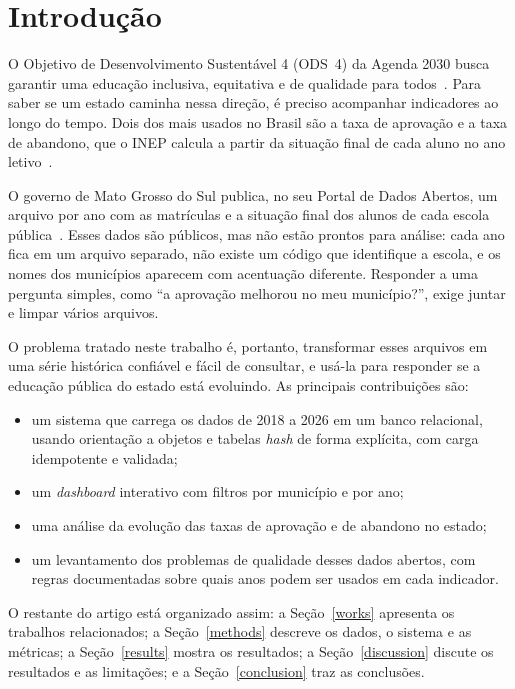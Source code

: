 \documentclass[preprint,10pt,5p]{elsarticle}
\begin{document}

\section{Introdução}
\label{intro}

O Objetivo de Desenvolvimento Sustentável 4 (ODS~4) da Agenda 2030 busca garantir uma educação inclusiva, equitativa e de qualidade para todos~\citep{onu2015ods4}. Para saber se um estado caminha nessa direção, é preciso acompanhar indicadores ao longo do tempo. Dois dos mais usados no Brasil são a taxa de aprovação e a taxa de abandono, que o INEP calcula a partir da situação final de cada aluno no ano letivo~\citep{inep2026rendimento}.

O governo de Mato Grosso do Sul publica, no seu Portal de Dados Abertos, um arquivo por ano com as matrículas e a situação final dos alunos de cada escola pública~\citep{dadosms2026matriculas}. Esses dados são públicos, mas não estão prontos para análise: cada ano fica em um arquivo separado, não existe um código que identifique a escola, e os nomes dos municípios aparecem com acentuação diferente. Responder a uma pergunta simples, como ``a aprovação melhorou no meu município?'', exige juntar e limpar vários arquivos.

O problema tratado neste trabalho é, portanto, transformar esses arquivos em uma série histórica confiável e fácil de consultar, e usá-la para responder se a educação pública do estado está evoluindo. As principais contribuições são:

\begin{itemize}
    \item um sistema que carrega os dados de 2018 a 2026 em um banco relacional, usando orientação a objetos e tabelas \textit{hash} de forma explícita, com carga idempotente e validada;
    \item um \textit{dashboard} interativo com filtros por município e por ano;
    \item uma análise da evolução das taxas de aprovação e de abandono no estado;
    \item um levantamento dos problemas de qualidade desses dados abertos, com regras documentadas sobre quais anos podem ser usados em cada indicador.
\end{itemize}

O restante do artigo está organizado assim: a Seção~\ref{works} apresenta os trabalhos relacionados; a Seção~\ref{methods} descreve os dados, o sistema e as métricas; a Seção~\ref{results} mostra os resultados; a Seção~\ref{discussion} discute os resultados e as limitações; e a Seção~\ref{conclusion} traz as conclusões.
\end{document}
